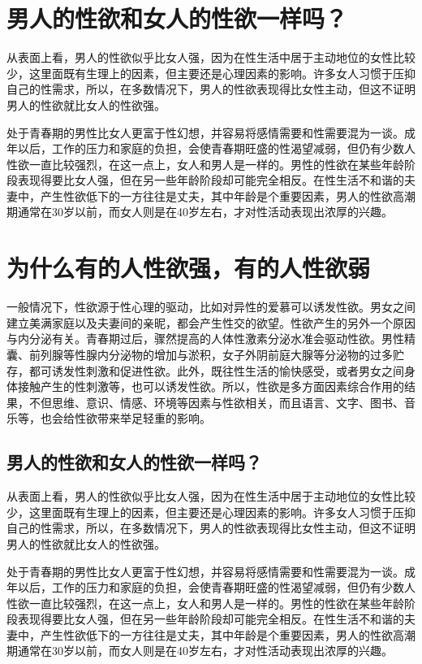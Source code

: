 \documentclass[12pt,UTF8]{ctexbook}
\begin{document}
\chapter{男人的性欲和女人的性欲一样吗？}

从表面上看，男人的性欲似乎比女人强，因为在性生活中居于主动地位的女性比较少，这里面既有生理上的因素，但主要还是心理因素的影响。许多女人习惯于压抑自己的性需求，所以，在多数情况下，男人的性欲表现得比女性主动，但这不证明男人的性欲就比女人的性欲强。

处于青春期的男性比女人更富于性幻想，并容易将感情需要和性需要混为一谈。成年以后，工作的压力和家庭的负担，会使青春期旺盛的性渴望减弱，但仍有少数人性欲一直比较强烈，在这一点上，女人和男人是一样的。男性的性欲在某些年龄阶段表现得要比女人强，但在另一些年龄阶段却可能完全相反。在性生活不和谐的夫妻中，产生性欲低下的一方往往是丈夫，其中年龄是个重要因素，男人的性欲高潮期通常在30岁以前，而女人则是在40岁左右，才对性活动表现出浓厚的兴趣。

\chapter{为什么有的人性欲强，有的人性欲弱}

一般情况下，性欲源于性心理的驱动，比如对异性的爱慕可以诱发性欲。男女之间建立美满家庭以及夫妻间的亲昵，都会产生性交的欲望。性欲产生的另外一个原因与内分泌有关。青春期过后，骤然提高的人体性激素分泌水准会驱动性欲。男性精囊、前列腺等性腺内分泌物的增加与淤积，女子外阴前庭大腺等分泌物的过多贮存，都可诱发性刺激和促进性欲。此外，既往性生活的愉快感受，或者男女之间身体接触产生的性刺激等，也可以诱发性欲。所以，性欲是多方面因素综合作用的结果，不但思维、意识、情感、环境等因素与性欲相关，而且语言、文字、图书、音乐等，也会给性欲带来举足轻重的影响。

\section{男人的性欲和女人的性欲一样吗？}

从表面上看，男人的性欲似乎比女人强，因为在性生活中居于主动地位的女性比较少，这里面既有生理上的因素，但主要还是心理因素的影响。许多女人习惯于压抑自己的性需求，所以，在多数情况下，男人的性欲表现得比女性主动，但这不证明男人的性欲就比女人的性欲强。

处于青春期的男性比女人更富于性幻想，并容易将感情需要和性需要混为一谈。成年以后，工作的压力和家庭的负担，会使青春期旺盛的性渴望减弱，但仍有少数人性欲一直比较强烈，在这一点上，女人和男人是一样的。男性的性欲在某些年龄阶段表现得要比女人强，但在另一些年龄阶段却可能完全相反。在性生活不和谐的夫妻中，产生性欲低下的一方往往是丈夫，其中年龄是个重要因素，男人的性欲高潮期通常在30岁以前，而女人则是在40岁左右，才对性活动表现出浓厚的兴趣。
\end{document}
